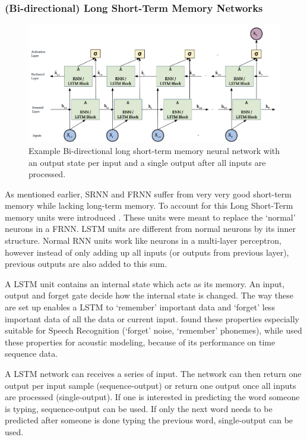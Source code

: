 \subsubsection{(Bi-directional) Long Short-Term Memory Networks}
\begin{figure}[t]
    \centering
    \includegraphics[width=\textwidth]{images/b-lstm}
    \caption{Example Bi-directional long short-term memory neural network with an output state per input and a single output after all inputs are processed.}
    \label{fig:b-lstm}
\end{figure}
As mentioned earlier, SRNN and FRNN suffer from very very good short-term memory while lacking long-term memory. To account for this Long Short-Term memory units were introduced \cite{Hochreiter1997long}. These units were meant to replace the `normal' neurons in a FRNN. LSTM units are different from normal neurons by its inner structure. Normal RNN units work like neurons in a multi-layer perceptron, however instead of only adding up all inputs (or outputs from previous layer), previous outputs are also added to this sum.

A LSTM unit contains an internal state which acts as its memory. An input, output and forget gate decide how the internal state is changed. The way these are set up enables a LSTM to `remember' important data and `forget' less important data of all the data or current input. \textcite{Li2015constructing} found these properties especially suitable for Speech Recognition (`forget' noise, `remember' phonemes), while \textcite{Sak2014long} used these properties for acoustic modeling, because of its performance on time sequence data.

A LSTM network can receives a series of input. The network can then return one output per input sample (sequence-output) or return one output once all inputs are processed (single-output). If one is interested in predicting the word someone is typing, sequence-output can be used. If only the next word needs to be predicted after someone is done typing the previous word, single-output can be used.

